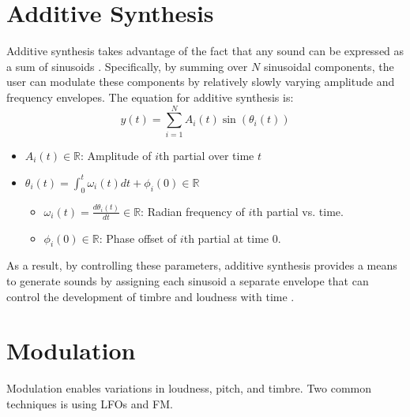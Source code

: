 \documentclass[12pt]{article}
\begin{document}
\section{Additive Synthesis}
Additive synthesis takes advantage of the fact that any sound can be expressed as a sum of sinusoids \cite{SASP}. Specifically, by summing over $N$ sinusoidal components, the user can modulate these components by relatively slowly varying amplitude and frequency envelopes. The equation for additive synthesis is:
\begin{equation}
    y(t) = \sum_{i=1}^{N} A_i(t) \sin\left(\theta_i (t)\right)
\end{equation}
\begin{itemize}
    \item $A_i(t) \in \mathbb{R}$: Amplitude of $i$th partial over time $t$
    \item $\theta_i (t) = \int_0^t \omega_i(t)dt + \phi_i(0) \in \mathbb{R}$
    \begin{itemize}
        \item $\omega_i(t)=\frac{d\theta_i(t)}{dt} \in \mathbb{R}$: Radian frequency of $i$th partial vs. time.
        \item $\phi_i(0) \in \mathbb{R}$: Phase offset of $i$th partial at time $0$.
    \end{itemize}
\end{itemize}

As a result, by controlling these parameters, additive synthesis provides a means to generate sounds by assigning each sinusoid a separate envelope that can control the development of timbre and loudness with time \cite{MAMO}. 

\section{Modulation}
Modulation enables variations in loudness, pitch, and timbre. Two common techniques is using LFOs and FM. 
\end{document}
